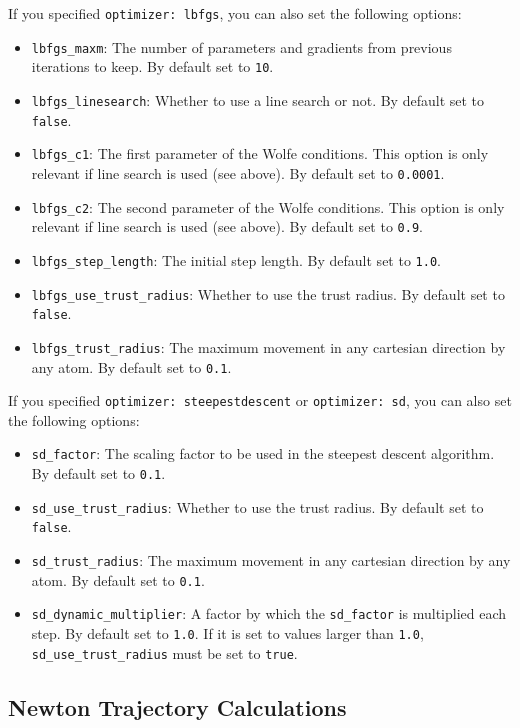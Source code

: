\documentclass[]{tufte-book}
\begin{document}
If you specified \texttt{optimizer: lbfgs}, you can also set the following options:
\begin{itemize}
\item \texttt{lbfgs\_maxm}: The number of parameters and gradients from previous iterations to keep. By default set to
\texttt{10}.
\item \texttt{lbfgs\_linesearch}: Whether to use a line search or not. By default set to \texttt{false}.
\item \texttt{lbfgs\_c1}: The first parameter of the Wolfe conditions. This option is only relevant if line search is
used (see above). By default set to \texttt{0.0001}.
\item \texttt{lbfgs\_c2}:  The second parameter of the Wolfe conditions. This option is only relevant if line search is
used (see above). By default set to \texttt{0.9}.
\item \texttt{lbfgs\_step\_length}: The initial step length. By default set to \texttt{1.0}.
\item \texttt{lbfgs\_use\_trust\_radius}: Whether to use the trust radius. By default set to \texttt{false}.
\item \texttt{lbfgs\_trust\_radius}: The maximum movement in any cartesian direction by any atom. By default set to \texttt{0.1}.
\end{itemize}

If you specified \texttt{optimizer: steepestdescent} or \texttt{optimizer: sd}, you can also set the following options:
\begin{itemize}
\item \texttt{sd\_factor}: The scaling factor to be used in the steepest descent algorithm. By default set to \texttt{0.1}.
\item \texttt{sd\_use\_trust\_radius}: Whether to use the trust radius. By default set to \texttt{false}.
\item \texttt{sd\_trust\_radius}: The maximum movement in any cartesian direction by any atom. By default set to \texttt{0.1}.
\item \texttt{sd\_dynamic\_multiplier}: A factor by which the \texttt{sd\_factor} is multiplied each step. By default set to \texttt{1.0}.
If it is set to values larger than \texttt{1.0}, \texttt{sd\_use\_trust\_radius} must be set to \texttt{true}.
\end{itemize}

\subsection{Newton Trajectory Calculations}
\end{document}
